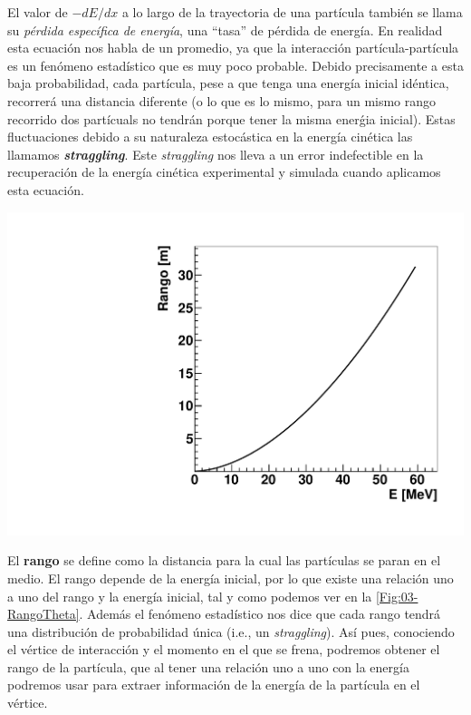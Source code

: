 \begin{minipage}{0.48 \linewidth}
El valor de \( -dE/dx \) a lo largo de la trayectoria de una partícula también se llama su \textit{pérdida específica de energía}, una ``tasa'' de pérdida de energía. En realidad esta ecuación nos habla de un promedio, ya que la interacción partícula-partícula es un fenómeno estadístico que es muy poco probable. Debido precisamente a esta baja probabilidad, cada partícula, pese a que tenga una energía inicial idéntica, recorrerá una distancia diferente (o lo que es lo mismo, para un mismo rango recorrido dos partícuals no tendrán porque tener la misma enerǵia inicial). Estas fluctuaciones debido a su naturaleza estocástica en la energía cinética las llamamos \textbf{\textit{straggling}}. Este \textit{straggling} nos lleva a un error indefectible en la recuperación de la energía cinética experimental y simulada cuando aplicamos esta ecuación. 

\end{minipage}
\hfill
\begin{minipage}{0.48\linewidth}
    \centering
    \includegraphics[width=1\linewidth]{Imagenes/RangoEnergiaTeo.pdf}
    \label{Fig:03-RangoTheta}
\end{minipage}

El \textbf{rango} se define como la distancia para la cual las partículas se paran en el medio. El rango depende de la energía inicial, por lo que existe una relación uno a uno del rango y la energía inicial, tal y como podemos ver en la \cref{Fig:03-RangoTheta}. Además el fenómeno estadístico nos dice que cada rango tendrá una distribución de probabilidad única (i.e., un \textit{straggling}). Así pues, conociendo el vértice de interacción y el momento en el que se frena, podremos obtener el rango de la partícula, que al tener una relación uno a uno con la energía podremos usar para extraer información de la energía de la partícula en el vértice.  


